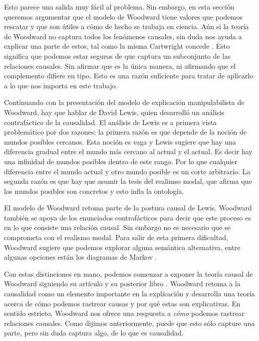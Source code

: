 Esto parece una salida muy fácil al problema. Sin embargo, en esta sección queremos argumentar que el modelo de Woodward tiene valores que podemos rescatar y que son útiles a cómo de hecho se trabaja en ciencia. Aún si la teoría de Woodward no captura todos los fenómenos causales, sin duda nos ayuda a explicar una parte de estos, tal como la misma Cartwright concede \citeyear[cap. 7]{Cartwright2007}. Esto significa que podemos estar seguros de que captura un subconjunto de las relaciones causales. Sin afirmar que es la única manera, ni afirmando que el complemento difiere en tipo. Esto es una razón suficiente para tratar de aplicarlo a lo que nos importa en este trabajo.

Continuando con la presentación del modelo de explicación manipulabilista de Woodward, hay que hablar de David Lewis, quien desarrolló \citeyear{Lewis1973a} un análisis contrafáctico de la causalidad. El análisis de Lewis es a primera vista problemático por dos razones: la primera razón es que depende de la noción de mundos posibles cercanos. Esta noción es vaga y Lewis sugiere que hay una diferencia gradual entre el mundo más cercano al actual y el actual. Es decir hay una infinidad de mundos posibles dentro de este rango. Por lo que cualquier diferencia entre el mundo actual y otro mundo posible es un corte arbitrario. La segunda razón es que hay que asumir la tesis del realimso modal, que afirma que los mundos posibles son concretos y esto infla la ontología.

El modelo de Woodward retoma parte de la postura causal de Lewis. Woodward también se apoya de los enunciados contrafácticos para decir que este proceso es en lo que consiste una relación causal. Sin embargo no es necesario que se comprometa con el realismo modal. Para salir de esta primera dificultad, Woodward sugiere que podemos explorar alguna semántica alternativa, entre algunas opciones están los diagramas de Markov \cite{pittphilsci18628}.

Con estas distinciones en mano, podemos comenzar a exponer la teoría causal de Woodward siguiendo su artículo \citeyear{Woodward2000} y su posterior libro \citeyear{Woodward2003}.  Woodward  retoma a la causalidad como un elemento importante en la explicación y desarrolla una teoría acerca de cómo podemos rastrear causas y por qué estas son explicativas. En sentido estricto, Woodward nos ofrece una respuesta a \textit{cómo} podemos rastrear relaciones causales. Como dijimos anteriormente, puede que esto sólo capture una parte, pero sin duda captura algo, de lo que es causalidad.

